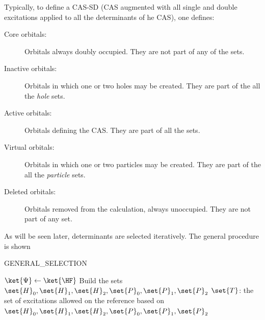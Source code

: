 Typically, to define a CAS-SD (CAS augmented with all single and double excitations applied to all the determinants of he CAS), one defines:
\begin{description}
\item [Core orbitals:]
Orbitals always doubly occupied. They are not part of any of the sets.
\item [Inactive orbitals:]
Orbitals in which one or two holes may be created. They are part of the all the \emph{hole} sets.
\item [Active orbitals:]
Orbitals defining the CAS. They are part of all the sets.
\item [Virtual orbitals:]
Orbitals in which one or two particles may be created. They are part of the all the \emph{particle} sets.
\item [Deleted orbitals:]
Orbitals removed from the calculation, always unoccupied. They are not part of any set.
\end{description}


 As will be seen later, determinants are selected iteratively. The general procedure is shown 



\begin{algorithm}
	\caption{GENERAL\_SELECTION}	
	\label{alg:GENERAL_SELECTION}	
	$\ket{\Psi} \gets \ket{\HF}$\;
	Build the sets $\set{H}_0, \set{H}_1, \set{H}_2, \set{P}_0, \set{P}_1, \set{P}_2$ \;
	$\set{T}$: the set of excitations allowed on the reference based on $\set{H}_0, \set{H}_1, \set{H}_2, \set{P}_0, \set{P}_1, \set{P}_2$ \;
	
\end{algorithm}


